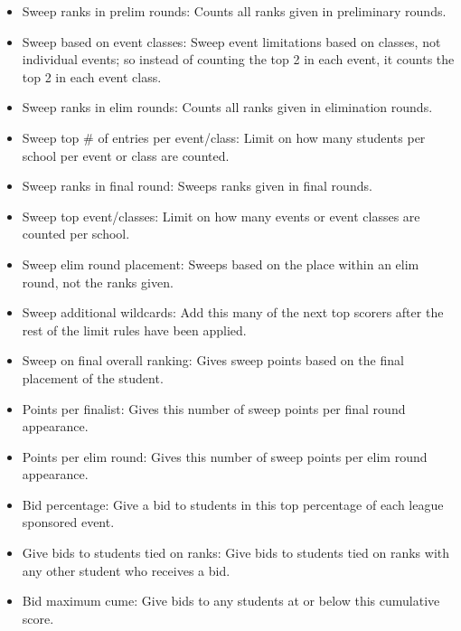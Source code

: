 \documentclass[12pt]{report} \usepackage {fullpage} \usepackage{times}
\begin{document}
\begin{itemize}
\item Sweep ranks in prelim rounds: 	Counts all ranks given in
preliminary rounds.

\item Sweep based on event classes:   Sweep event limitations based on
classes, not individual events;  so instead of counting the top 2 in each
event, it counts the top 2 in each event class.

\item Sweep ranks in elim rounds: 	Counts all ranks given in elimination
rounds.

\item Sweep top \# of entries per event/class: 	Limit on how many students
per school per event or class are counted.

\item Sweep ranks in final round: 	 Sweeps ranks given in final rounds.

\item Sweep top event/classes:  Limit on how many events or event classes
are counted per school.

\item Sweep elim round placement: 	  Sweeps based on the place within an
elim round, not the ranks given.

\item Sweep additional wildcards:   Add this many of the next top scorers
after the rest of the limit rules have been applied.
		
\item Sweep on final overall ranking:  Gives sweep points based on the
final placement of the student.

\item Points per finalist:   Gives this number of sweep points per final
round appearance.

\item Points per elim round: Gives this number of sweep points per elim
round appearance.

\item Bid percentage:   Give a bid to students in this top percentage of
each league sponsored event.
		
\item Give bids to students tied on ranks: 	Give bids to students tied on
ranks with any other student who receives a bid.

\item Bid maximum cume: 	Give bids to any students at or below this
cumulative score.


\end{itemize}
\end{document}
